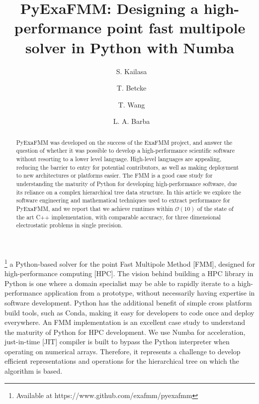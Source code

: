 \documentclass{IEEEcsmag}
\begin{document}

\title{PyExaFMM: Designing a high-performance point fast multipole solver in Python with Numba}

\author{\ S. Kailasa}

\author{\ T. Betcke}

\author{\ T. Wang}

\author{\ L. A. Barba}


\begin{abstract}
PyExaFMM was developed on the success of the ExaFMM project, and answer the question of whether it was possible to develop a high-performance scientific software without resorting to a lower level language. High-level languages are appealing, reducing the barrier to entry for potential contributors, as well as making deployment to new architectures or platforms easier. The FMM is a good case study for understanding the maturity of Python for developing high-performance software, due its reliance on a complex hierarchical tree data structure. In this article we explore the software engineering and mathematical techniques used to extract performance for PyExaFMM, and we report that we achieve runtimes within $\mathcal{O}(10)$ of the state of the art C++ implementation, with comparable accuracy, for three dimensional electrostatic problems in single precision.

\end{abstract}

\maketitle
{}\footnote{Available at https://www.github.com/exafmm/pyexafmm} a Python-based solver for the point Fast Multipole Method [FMM], designed for high-performance computing [HPC]. The vision behind building a HPC library in Python is one where a domain specialist may be able to rapidly iterate to a high-performance application from a prototype, without necessarily having expertise in software development. Python has the additional benefit of simple cross platform build tools, such as Conda, making it easy for developers to code once and deploy everywhere. An FMM implementation is an excellent case study to understand the maturity of Python for HPC development. We use Numba for acceleration, just-in-time [JIT] compiler is built to bypass the Python interpreter when operating on numerical arrays. Therefore, it represents a challenge to develop efficient representations and operations for the hierarchical tree on which the algorithm is based.
\end{document}
